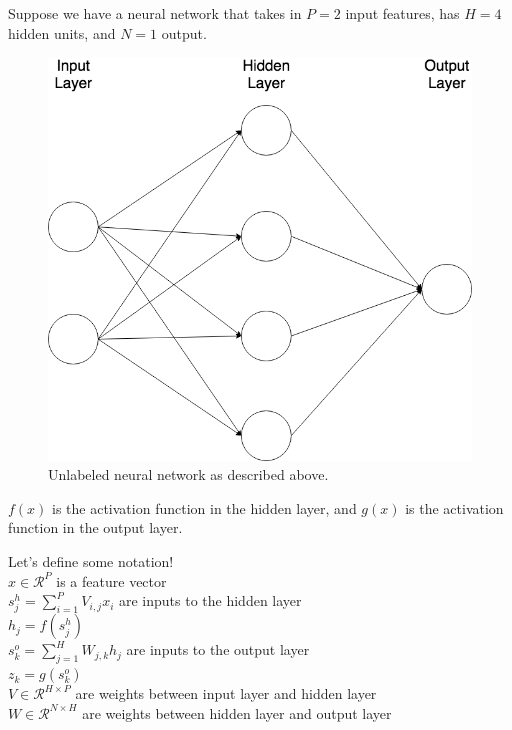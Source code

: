 \newpage
{}

Suppose we have a neural network that takes in $P = 2$ input features, has $H = 4$ hidden units, and $N = 1$ output.
\begin{figure}[h!]
\begin{center}
  \includegraphics[width=5in]{src/problems/nn/small_neural_net.png}
  \caption{Unlabeled neural network as described above.}
\end{center}
\end{figure}

$f(x)$ is the activation function in the hidden layer, and $g(x)$ is the activation function in the output layer.

Let's define some notation! \\
$x\in \mathcal{R}^{P}$ is a feature vector\\
$s^h_j = \sum_{i=1}^{P} V_{i, j}x_i$ are inputs to the hidden layer \\
$h_j = f(s^h_j)$\\
$s^o_k = \sum_{j=1}^{H} W_{j, k}h_j$ are inputs to the output layer\\
$z_k = g(s^o_k)$ \\
$V \in \mathcal{R}^{H\times P}$ are weights between input layer and hidden layer\\
$W \in \mathcal{R}^{N\times H}$ are weights between hidden layer and output layer\\

